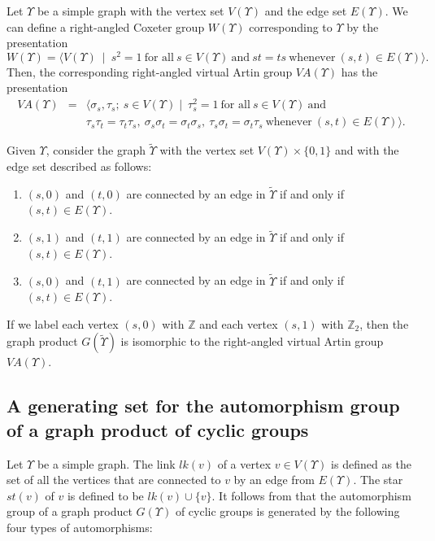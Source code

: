\documentclass[12pt]{amsart}
\numberwithin{equation}{section}
\begin{document}
 
Let $\Upsilon$ be a simple graph with the vertex set $V(\Upsilon)$ and the edge set $E(\Upsilon)$. We can define a right-angled Coxeter group $W(\Upsilon)$ corresponding to $\Upsilon$ by the presentation 
$$
W(\Upsilon)= \Bigg\langle V(\Upsilon)~ \mid~ s^2=1~ \textrm{for all}~s \in V(\Upsilon) ~\textrm{and}~ s t= t s~\textrm{whenever}~ (s, t)  \in E(\Upsilon) \Bigg\rangle.
$$
Then, the corresponding right-angled virtual Artin group  $VA(\Upsilon)$ has the presentation 
\begin{eqnarray*}
VA(\Upsilon) &=& \Bigg\langle \sigma_s, \tau_s;~ s \in V(\Upsilon) \mid~ \tau_s^2=1~ \textrm{for all}~s \in V(\Upsilon)~\textrm{and}~\\
&&  \tau_s \tau_t= \tau_t \tau_s, ~\sigma_s \sigma_t= \sigma_t \sigma_s, ~ \tau_s \sigma_t= \sigma_t \tau_s~\textrm{whenever}~ (s, t)  \in E(\Upsilon) \Bigg\rangle.
\end{eqnarray*}

Given $\Upsilon$, consider the graph $\widetilde{\Upsilon}$ with the vertex set $V(\Upsilon) \times \{0,1\}$ and with the edge set described as follows:
\begin{enumerate}
\item $(s,0)$ and $(t,0)$ are connected by an edge in $\widetilde{\Upsilon}$ if and only if $(s, t) \in E(\Upsilon)$.
\item $(s,1)$ and $(t,1)$ are connected by an edge  in $\widetilde{\Upsilon}$ if and only if $(s, t) \in E(\Upsilon)$.
\item $(s,0)$ and $(t,1)$ are connected by an edge  in $\widetilde{\Upsilon}$ if and only if $(s, t) \in E(\Upsilon)$.
\end{enumerate}
If we label each vertex $(s,0)$ with $\mathbb Z$ and each vertex $(s,1)$ with $\mathbb Z_2$, then the graph product  $G(\widetilde{\Upsilon})$ is isomorphic to the right-angled virtual Artin group $VA(\Upsilon)$.
\medskip

\subsection{A generating set for the automorphism group of a graph product of cyclic groups}
Let $\Upsilon$ be a simple graph. The link $lk(v)$ of a vertex $v \in V(\Upsilon)$ is defined as the set of all the vertices that are connected to $v$ by an edge from $E(\Upsilon)$. The star  $st(v)$ of $v$ is defined to be $lk(v) \cup \{v\}$. It follows from \cite[Main Theorem]{MR2900856} that the automorphism group of a graph product $G(\Upsilon)$ of cyclic groups  is generated by the following four types of automorphisms: 
\end{document}
